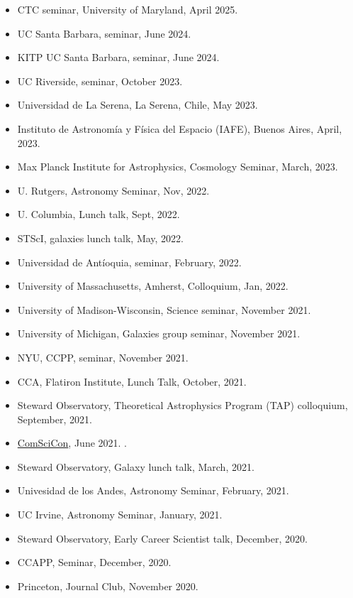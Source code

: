 \documentclass[14pt]{article}
\begin{document}
\begin{itemize}
  \setlength\itemsep{0.0em}
  \renewcommand\labelitemi{$\cdot$}

\item CTC seminar, University of Maryland, April 2025.\dag 
\item UC Santa Barbara, seminar, June 2024. \dag
\item KITP UC Santa Barbara, seminar, June 2024. \dag
\item UC Riverside, seminar, October 2023. \dag
\item Universidad de La Serena, La Serena, Chile, May 2023. \dag 
\item Instituto de Astronom\'ia y F\'isica del Espacio (IAFE), Buenos Aires, April, 2023.
\item Max Planck Institute for Astrophysics, Cosmology Seminar, March, 2023.
\item U. Rutgers, Astronomy Seminar, Nov, 2022. \dag
\item U. Columbia, Lunch talk, Sept, 2022. \dag
\item STScI, galaxies lunch talk, May, 2022. \dag
\item Universidad de Ant\'ioquia, seminar, February, 2022. \dag 
\item University of Massachusetts, Amherst, Colloquium, Jan, 2022. \dag
\item University of Madison-Wisconsin, Science seminar, November 2021.\dag
\item University of Michigan, Galaxies group seminar, November 2021.\dag
\item NYU, CCPP, seminar, November 2021.\dag 
\item CCA, Flatiron Institute, Lunch Talk, October, 2021.
\item Steward Observatory, Theoretical Astrophysics Program (TAP) colloquium, September, 2021.\dag
\item \href{https://comscicon.com/comscicon-en-espa%C3%B1ol-2021}{ComSciCon},
    June 2021. \dag. 
\item Steward Observatory, Galaxy lunch talk, March, 2021.
\item Univesidad de los Andes, Astronomy Seminar, February, 2021. 
\item UC Irvine, Astronomy Seminar, January, 2021. \dag
\item Steward Observatory, Early Career Scientist talk, December, 2020. \dag
\item CCAPP, Seminar, December, 2020. \dag
\item Princeton, Journal Club, November 2020. \dag

\end{itemize}
\end{document}
